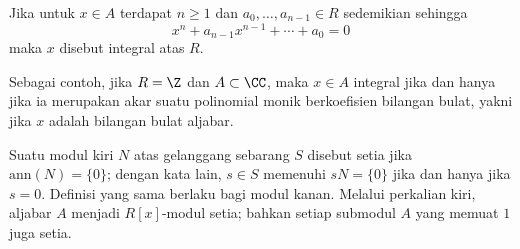 \begin{definition}[Integralitas]\label{def:integrality}
	Jika untuk $x \in A$ terdapat $n \geq 1$ dan $a_0, \ldots, a_{n-1} \in R$ sedemikian sehingga
	\begin{equation}\label{eqn:integrality}
		x^n + a_{n-1} x^{n-1} + \cdots + a_0 = 0
	\end{equation}
	maka $x$ disebut integral atas $R$.
\end{definition}
Sebagai contoh, jika $R=\Z$ dan $A \subset \CC$, maka $x \in A$ integral jika dan hanya jika ia merupakan akar suatu polinomial monik berkoefisien bilangan bulat, yakni jika $x$ adalah bilangan bulat aljabar.

Suatu modul kiri $N$ atas gelanggang sebarang $S$ disebut setia jika $\text{ann}(N) = \{0\}$; dengan kata lain, $s \in S$ memenuhi $sN=\{0\}$ jika dan hanya jika $s=0$. Definisi yang sama berlaku bagi modul kanan. Melalui perkalian kiri, aljabar $A$ menjadi $R[x]$-modul setia; bahkan setiap submodul $A$ yang memuat $1$ juga setia.

